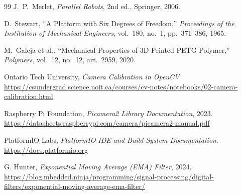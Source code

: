 \documentclass[12pt,a4paper]{report}
\begin{document}
\begin{thebibliography}{99}
J.~P.~Merlet,
\textit{Parallel Robots}, 2nd ed.,
Springer, 2006.

D.~Stewart,
``A Platform with Six Degrees of Freedom,''
\textit{Proceedings of the Institution of Mechanical Engineers},
vol.~180, no.~1, pp.~371--386, 1965.

M.~Galeja et al.,
``Mechanical Properties of 3D-Printed PETG Polymer,''
\textit{Polymers},
vol.~12, no.~12, art.~2959, 2020.

Ontario Tech University,
\textit{Camera Calibration in OpenCV}
\url {https://csundergrad.science.uoit.ca/courses/cv-notes/notebooks/02-camera-calibration.html}

Raspberry Pi Foundation,
\textit{Picamera2 Library Documentation},
2023.
\url{https://datasheets.raspberrypi.com/camera/picamera2-manual.pdf}

PlatformIO Labs,
\textit{PlatformIO IDE and Build System Documentation}.
\url{https://docs.platformio.org}

G. Hunter,
\textit{Exponential Moving Average (EMA) Filter},
2024.
\url{https://blog.mbedded.ninja/programming/signal-processing/digital-filters/exponential-moving-average-ema-filter/}



\end{thebibliography}
\end{document}
